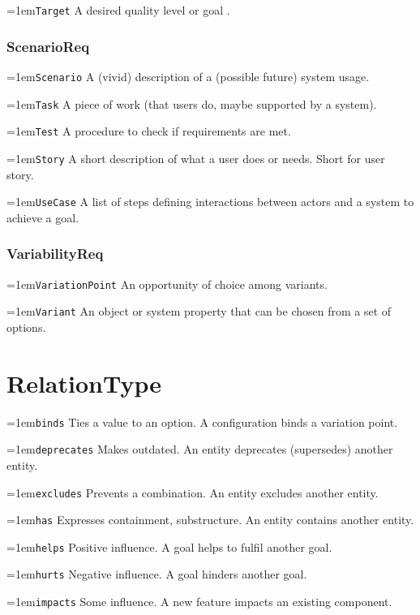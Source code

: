 \documentclass[9pt,a4paper,oneside]{report}
\begin{document}
\begin{multicols*}{4}
\hangindent=1em\lstinline+Target+ A desired quality level or goal .

\subsubsection*{ScenarioReq}

\hangindent=1em\lstinline+Scenario+ A (vivid) description of a (possible future) system usage.

\hangindent=1em\lstinline+Task+ A piece of work (that users do, maybe supported by a system).

\hangindent=1em\lstinline+Test+ A procedure to check if requirements are met.

\hangindent=1em\lstinline+Story+ A short description of what a user does or needs. Short for user story.

\hangindent=1em\lstinline+UseCase+ A list of steps defining interactions between actors and a system to achieve a goal.

\subsubsection*{VariabilityReq}

\hangindent=1em\lstinline+VariationPoint+ An opportunity of choice among variants.

\hangindent=1em\lstinline+Variant+ An object or system property that can be chosen from a set of options.

\section*{RelationType}

\hangindent=1em\lstinline+binds+ Ties a value to an option. A configuration binds a variation point.

\hangindent=1em\lstinline+deprecates+ Makes outdated. An entity deprecates (supersedes) another entity.

\hangindent=1em\lstinline+excludes+ Prevents a combination. An entity excludes another entity.

\hangindent=1em\lstinline+has+ Expresses containment, substructure. An entity contains another entity.

\hangindent=1em\lstinline+helps+ Positive influence. A goal helps to fulfil another goal.

\hangindent=1em\lstinline+hurts+ Negative influence. A goal hinders another goal.

\hangindent=1em\lstinline+impacts+ Some influence. A new feature impacts an existing component.


\end{multicols*}
\end{document}
